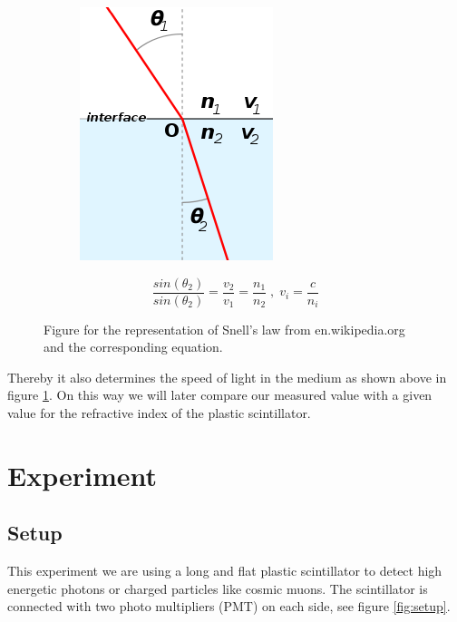 \documentclass[]{article}
\begin{document}
\begin{figure}[H]
\centering
\begin{subfigure}[c]{0.48\linewidth}
\centering
\includegraphics[width=.5\linewidth]{Plots/Snell.png}
\end{subfigure}
\begin{subfigure}{0.48\textwidth}
\begin{equation}
\frac{sin(\theta_2)}{sin(\theta_2)} =  \frac{v_2}{v_1} = \frac{n_1}{n_2} \; , \; v_i=\frac{c}{n_i}
\end{equation}
\end{subfigure}
\caption{Figure for the representation of Snell's law from en.wikipedia.org and the corresponding equation. }
\label{fig:snell}
\end{figure}

Thereby it also determines the speed of light in the medium as shown above in figure \ref{fig:snell}. On this way we will later compare our measured value with a given value for the refractive index of the plastic scintillator.


\newpage
\section{Experiment}
\subsection{Setup}\label{setup}
This experiment we are using a long and flat plastic scintillator to detect high energetic photons or charged particles like cosmic muons. The scintillator is connected with two photo multipliers (PMT) on each side, see figure \ref{fig:setup}.
\end{document}
